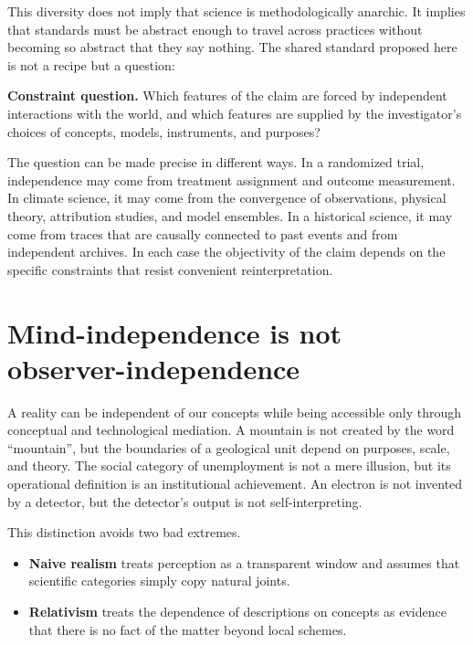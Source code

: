 This diversity does not imply that science is methodologically anarchic. It
implies that standards must be abstract enough to travel across practices
without becoming so abstract that they say nothing. The shared standard
proposed here is not a recipe but a question:

\begin{principlebox}
\textbf{Constraint question.} Which features of the claim are forced by
independent interactions with the world, and which features are supplied by the
investigator's choices of concepts, models, instruments, and purposes?
\end{principlebox}

The question can be made precise in different ways. In a randomized trial,
independence may come from treatment assignment and outcome measurement. In
climate science, it may come from the convergence of observations, physical
theory, attribution studies, and model ensembles. In a historical science, it
may come from traces that are causally connected to past events and from
independent archives. In each case the objectivity of the claim depends on the
specific constraints that resist convenient reinterpretation.

\section{Mind-independence is not observer-independence}

A reality can be independent of our concepts while being accessible only
through conceptual and technological mediation. A mountain is not created by
the word \enquote{mountain}, but the boundaries of a geological unit depend on
purposes, scale, and theory. The social category of unemployment is not a mere
illusion, but its operational definition is an institutional achievement. An
electron is not invented by a detector, but the detector's output is not
self-interpreting.

This distinction avoids two bad extremes.

\begin{itemize}
\item \textbf{Naive realism} treats perception as a transparent window and
assumes that scientific categories simply copy natural joints.
\item \textbf{Relativism} treats the dependence of descriptions on concepts as
evidence that there is no fact of the matter beyond local schemes.
\end{itemize}

